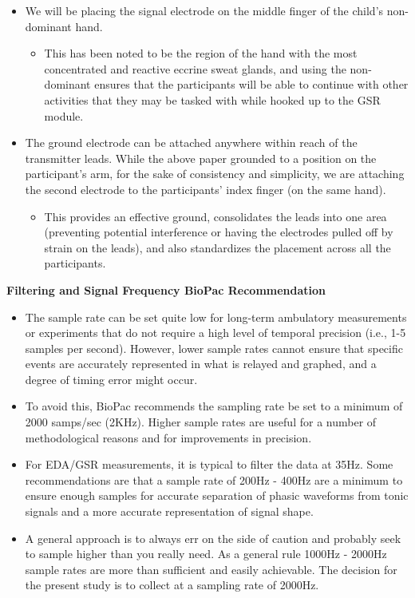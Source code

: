 \documentclass[]{book}
\providecommand{\tightlist}{%
  \setlength{\itemsep}{0pt}\setlength{\parskip}{0pt}}
\begin{document}
\begin{itemize}
\tightlist
\item
  We will be placing the signal electrode on the middle finger of the
  child's non-dominant hand.

  \begin{itemize}
  \tightlist
  \item
    This has been noted to be the region of the hand with the most
    concentrated and reactive eccrine sweat glands, and using the
    non-dominant ensures that the participants will be able to continue
    with other activities that they may be tasked with while hooked up
    to the GSR module.
  \end{itemize}
\item
  The ground electrode can be attached anywhere within reach of the
  transmitter leads. While the above paper grounded to a position on the
  participant's arm, for the sake of consistency and simplicity, we are
  attaching the second electrode to the participants' index finger (on
  the same hand).

  \begin{itemize}
  \tightlist
  \item
    This provides an effective ground, consolidates the leads into one
    area (preventing potential interference or having the electrodes
    pulled off by strain on the leads), and also standardizes the
    placement across all the participants.
  \end{itemize}
\end{itemize}

\textbf{Filtering and Signal Frequency BioPac Recommendation}

\begin{itemize}
\tightlist
\item
  The sample rate can be set quite low for long-term ambulatory
  measurements or experiments that do not require a high level of
  temporal precision (i.e., 1-5 samples per second). However, lower
  sample rates cannot ensure that specific events are accurately
  represented in what is relayed and graphed, and a degree of timing
  error might occur.
\item
  To avoid this, BioPac recommends the sampling rate be set to a minimum
  of 2000 samps/sec (2KHz). Higher sample rates are useful for a number
  of methodological reasons and for improvements in precision.
\item
  For EDA/GSR measurements, it is typical to filter the data at 35Hz.
  Some recommendations are that a sample rate of 200Hz - 400Hz are a
  minimum to ensure enough samples for accurate separation of phasic
  waveforms from tonic signals and a more accurate representation of
  signal shape.
\item
  A general approach is to always err on the side of caution and
  probably seek to sample higher than you really need. As a general rule
  1000Hz - 2000Hz sample rates are more than sufficient and easily
  achievable. The decision for the present study is to collect at a
  sampling rate of 2000Hz.
\end{itemize}
\end{document}
